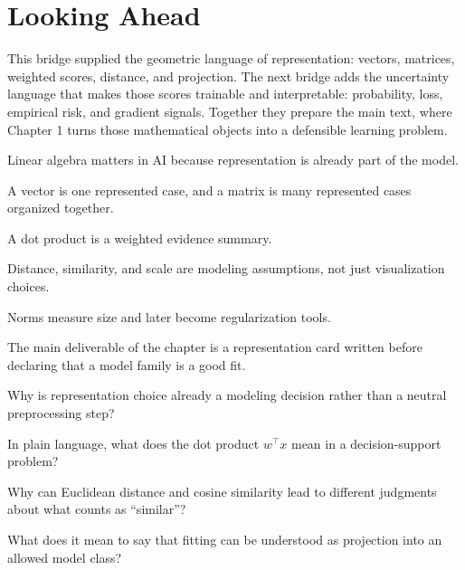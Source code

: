 \section*{Looking Ahead}

This bridge supplied the geometric language of representation: vectors, matrices, weighted scores, distance, and projection. The next bridge adds the uncertainty language that makes those scores trainable and interpretable: probability, loss, empirical risk, and gradient signals. Together they prepare the main text, where Chapter 1 turns those mathematical objects into a defensible learning problem.

\begin{chaptersummary}
\item Linear algebra matters in AI because representation is already part of the model.
\item A vector is one represented case, and a matrix is many represented cases organized together.
\item A dot product is a weighted evidence summary.
\item Distance, similarity, and scale are modeling assumptions, not just visualization choices.
\item Norms measure size and later become regularization tools.
\item The main deliverable of the chapter is a representation card written before declaring that a model family is a good fit.
\end{chaptersummary}

\begin{studyquestions}
\item Why is representation choice already a modeling decision rather than a neutral preprocessing step?
\item In plain language, what does the dot product \(w^\top x\) mean in a decision-support problem?
\item Why can Euclidean distance and cosine similarity lead to different judgments about what counts as ``similar''?
\item What does it mean to say that fitting can be understood as projection into an allowed model class?
\end{studyquestions}

